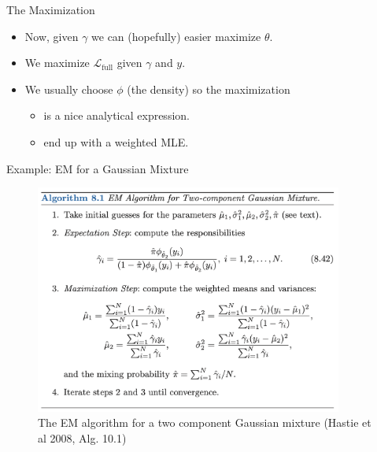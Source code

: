 \documentclass[10pt]{beamer}
\begin{document}
\begin{frame}{The Maximization}

\begin{itemize}
\item Now, given $\gamma$ we can (hopefully) easier maximize $\theta$.\pause
\item We maximize $\mathcal{L}_{\text{full}}$ given $\gamma$ and $y$.\pause
\item We usually choose $\phi$ (the density) so the maximization
\begin{itemize}
\item is a nice analytical expression.
\item end up with a weighted MLE.
\end{itemize}

\end{itemize}



\end{frame}

\begin{frame}{Example: EM for a Gaussian Mixture}

\begin{figure}[h]
\centering
\includegraphics[width=0.9\textwidth]{fig/algo_8_1_em_gaussian.png}
\caption{The EM algorithm for a two component Gaussian mixture (Hastie et al 2008, Alg. 10.1)}
\end{figure}

\end{frame}

\end{document}
